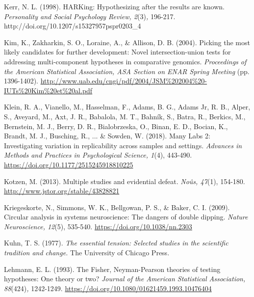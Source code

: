 \documentclass[authordate, empirical]{jote-new-article}
\begin{document}
	Kerr, N. L. (1998). HARKing: Hypothesizing after the results are known. \emph{Personality and Social Psychology Review, 2}(3)\emph{, }196-217. http://doi.org/10.1207/s15327957pspr0203\_4



	Kim, K., Zakharkin, S. O., Loraine, A., \& Allison, D. B. (2004). Picking the most likely candidates for further development: Novel intersection-union tests for addressing multi-component hypotheses in comparative genomics. \emph{Proceedings of the American Statistical Association, ASA Section on ENAR Spring Meeting} (pp. 1396-1402). \href{http://www.uab.edu/cngi/pdf/2004/JSM%202004%20-IUTs%20Kim%20et%20al.pdf}{http://www.uab.edu/cngi/pdf/2004/JSM\%202004\%20-IUTs\%20Kim\%20et\%20al.pdf}



	Klein, R. A., Vianello, M., Hasselman, F., Adams, B. G., Adams Jr, R. B., Alper, S., Aveyard, M., Axt, J. R., Babalola, M. T., Bahník, S., Batra, R., Berkics, M., Bernstein, M. J., Berry, D. R., Bialobrzeska, O., Binan, E. D., Bocian, K., Brandt, M. J., Busching, R., ... \& Sowden, W. (2018). Many Labs 2: Investigating variation in replicability across samples and settings. \emph{Advances in Methods and Practices in Psychological Science, 1}(4), 443-490. \href{https://doi.org/10.1177/2515245918810225}{https://doi.org/10.1177/2515245918810225}



	Kotzen, M. (2013). Multiple studies and evidential defeat. \emph{Noûs, 47}(1), 154-180. \href{http://www.jstor.org/stable/43828821}{http://www.jstor.org/stable/43828821}



	Kriegeskorte, N., Simmons, W. K., Bellgowan, P. S., \& Baker, C. I. (2009). Circular analysis in systems neuroscience: The dangers of double dipping. \emph{Nature Neuroscience, 12}(5), 535-540. \href{https://doi.org/10.1038/nn.2303}{https://doi.org/10.1038/nn.2303}



	Kuhn, T. S. (1977). \emph{The essential tension: Selected studies in the scientific tradition and change. }The University of Chicago Press.



	Lehmann, E. L. (1993). The Fisher, Neyman-Pearson theories of testing hypotheses: One theory or two? \emph{Journal of the American Statistical Association, 88}(424)\emph{,} 1242-1249. \href{https://doi.org/10.1080/01621459.1993.10476404}{https://doi.org/10.1080/01621459.1993.10476404}
\end{document}
